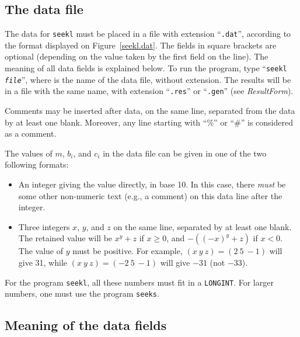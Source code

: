 \subsection* {The data file}

The data for {\tt seekl} must be placed in a file with extension
``{\tt .dat}'', according to the format displayed on Figure~\ref{seekl.dat}.
The fields in square brackets are optional (depending on the value taken
by the first field on the line).
The meaning of all data fields is explained below.
To run the program, type ``{\tt seekl \<\em file}\>'', where \> is
the name of the data file, without extension.
The results will be in a file with the same name, with extension
``{\tt .res}'' or ``{\tt .gen}'' (see {\em ResultForm\/}).

Comments may be inserted after data, on the same line,
separated from the data by at least one blank. 
Moreover, any line starting with ``\%'' or ``\#'' is considered
as a comment.

The values of $m$, $b_i$, and $c_i$ in the data file can be given in one
of the two following formats:
\vspace {-10pt}
\begin {itemize}
\item [a)]  An integer giving the value directly, in base 10.
  In this case, there {\em must\/} be some other non-numeric text 
  (e.g., a comment) on this data line after the integer.
\item [b)]  Three integers $x$, $y$, and $z$ on the same line, separated
  by at least one blank.  The retained value will be $x^y+z$ if $x\ge0$, and
  $-((-x)^y+z)$ if $x<0$.  The value of $y$ must be positive.
  For example, $(x\ y\ z) = (2\ 5\ -1)$ will give 31, while
  $(x\ y\ z) = (-2\ 5\ -1)$ will give $-31$ (not $-33$).
\end {itemize}
For the program {\tt seekl}, all these numbers must fit in a {\tt LONGINT}.
For larger numbers, one must use the program {\tt seeks}.

\subsection* {Meaning of the data fields}

